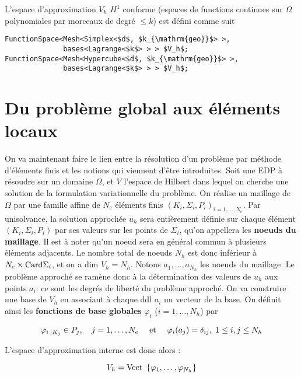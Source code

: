 L'espace d'approximation $V_h$  $H^1$ conforme (espaces de functions continues
sur $\Omega$ polynomiales par morceaux de degré $\leq k$) est défini comme suit
\begin{lstlisting}
FunctionSpace<Mesh<Simplex<$d$, $k_{\mathrm{geo}}$> >,
              bases<Lagrange<$k$> > > $V_h$;
FunctionSpace<Mesh<Hypercube<$d$, $k_{\mathrm{geo}}$> >,
              bases<Lagrange<$k$> > > $V_h$;
\end{lstlisting}




%
%
\section{Du problème global aux éléments locaux}
\label{sec:glob}
%
%
\noindent
On va maintenant faire le lien entre la résolution d'un problème par
méthode d'éléments finis et les notions qui viennent d'être
introduites.
%
Soit une EDP à résoudre sur un domaine $\Omega$, et $V$ l'espace de
Hilbert dans lequel on cherche une solution de la formulation variationnelle
du problème. On réalise un maillage de $\Omega$ par une famille affine de
$N_e$ éléments finis $(K_i,\Sigma_i,P_i)_{i=1,\ldots,N_e}$.
%
Par unisolvance, la solution approchée $u_h$ sera entièrement définie
sur chaque élément $(K_i,\Sigma_i,P_i)$ par ses valeurs sur les points de
$\Sigma_i$, qu'on appellera les {\bf noeuds du maillage}. Il est à noter
qu'un noeud sera en général commun à plusieurs éléments
adjacents. Le nombre total de noeuds $N_h$ est donc inférieur à
$N_e\times\hbox{Card} \Sigma_i$, et on a dim $V_h = N_h$. Notons
$a_1,\ldots,a_{N_h}$ les noeuds du maillage. Le problème approché se
ramène donc à la détermination des valeurs de $u_h$ aux points $a_i$: ce
sont les degrés de liberté du problème approché.
%
On va construire une base de $V_h$ en associant à chaque ddl $a_i$ un vecteur de la base. On définit ainsi les {\bf fonctions de base globales} $\varphi_i$ ($i=1,\ldots,N_h$) par

\begin{equation}
\varphi_i \,_{|K_j} \in P_j, \quad j=1,\ldots,N_e \quad\hbox{ et }\quad \varphi_i(a_j)=\delta_{ij}, \; 1\le i,j \le N_h\label{eq:28}
\end{equation}


%
L'espace d'approximation interne est donc alors :

\begin{equation}
V_h = \hbox{Vect }\left\{\varphi_1,\ldots,\varphi_{N_h}\right\}\label{eq:29}
\end{equation}


